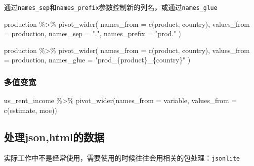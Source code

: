 \documentclass[
]{book}
\newenvironment{Shaded}{\begin{snugshade}}{\end{snugshade}}
\newcommand{\AttributeTok}[1]{\textcolor[rgb]{0.77,0.63,0.00}{#1}}
\newcommand{\FunctionTok}[1]{\textcolor[rgb]{0.00,0.00,0.00}{#1}}
\newcommand{\NormalTok}[1]{#1}
\newcommand{\SpecialCharTok}[1]{\textcolor[rgb]{0.00,0.00,0.00}{#1}}
\newcommand{\StringTok}[1]{\textcolor[rgb]{0.31,0.60,0.02}{#1}}
\begin{document}
通过\texttt{names\_sep}和\texttt{names\_prefix}参数控制新的列名，或通过\texttt{names\_glue}

\begin{Shaded}
\begin{Highlighting}[]
\NormalTok{production }\SpecialCharTok{\%\textgreater{}\%} \FunctionTok{pivot\_wider}\NormalTok{(}
  \AttributeTok{names\_from =} \FunctionTok{c}\NormalTok{(product, country), }
  \AttributeTok{values\_from =}\NormalTok{ production,}
  \AttributeTok{names\_sep =} \StringTok{"."}\NormalTok{,}
  \AttributeTok{names\_prefix =} \StringTok{"prod."}
\NormalTok{)}
\end{Highlighting}
\end{Shaded}

\begin{Shaded}
\begin{Highlighting}[]
\NormalTok{production }\SpecialCharTok{\%\textgreater{}\%} \FunctionTok{pivot\_wider}\NormalTok{(}
  \AttributeTok{names\_from =} \FunctionTok{c}\NormalTok{(product, country), }
  \AttributeTok{values\_from =}\NormalTok{ production,}
  \AttributeTok{names\_glue =} \StringTok{"prod\_\{product\}\_\{country\}"}
\NormalTok{)}
\end{Highlighting}
\end{Shaded}

\hypertarget{ux591aux503cux53d8ux5bbd}{%
\subsubsection{多值变宽}\label{ux591aux503cux53d8ux5bbd}}

\begin{Shaded}
\begin{Highlighting}[]
\NormalTok{us\_rent\_income }\SpecialCharTok{\%\textgreater{}\%} 
  \FunctionTok{pivot\_wider}\NormalTok{(}\AttributeTok{names\_from =}\NormalTok{ variable, }\AttributeTok{values\_from =} \FunctionTok{c}\NormalTok{(estimate, moe))}
\end{Highlighting}
\end{Shaded}

\hypertarget{ux5904ux7406jsonhtmlux7684ux6570ux636e}{%
\subsection{处理json,html的数据}\label{ux5904ux7406jsonhtmlux7684ux6570ux636e}}

实际工作中不是经常使用，需要使用的时候往往会用相关的包处理：\texttt{jsonlite}
\end{document}
